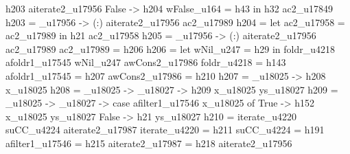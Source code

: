                                                                                                        h203 aiterate2_u17956
                                                                                                     False ->
                                                                                                       h204
                                                                                      wFalse_u164 = h43
                                                                                    in h32 ac2_u17849
                                                        h203 = _u17956 -> (:) aiterate2_u17956 ac2_u17989
                                                        h204 = let ac2_u17958 = ac2_u17989
                                                               in h21 ac2_u17958
                                                        h205 = _u17956 -> (:) aiterate2_u17956 ac2_u17989
                                                        ac2_u17989 = h206
                                                        h206 = let wNil_u247 = h29
                                                               in foldr_u4218 afoldr1_u17545 wNil_u247 awCons2_u17986
                                                        foldr_u4218 = h143
                                                        afoldr1_u17545 = h207
                                                        awCons2_u17986 = h210
                                                        h207 = \x_u18025 -> h208 x_u18025
                                                        h208 = \x_u18025 -> \ys_u18027 -> h209 x_u18025 ys_u18027
                                                        h209 = \x_u18025 -> \ys_u18027 -> case afilter1_u17546 x_u18025 of
                                                                                            True ->
                                                                                              h152 x_u18025 ys_u18027
                                                                                            False ->
                                                                                              h21 ys_u18027
                                                        h210 = iterate_u4220 suCC_u4224 aiterate2_u17987
                                                        iterate_u4220 = h211
                                                        suCC_u4224 = h191
                                                        afilter1_u17546 = h215
                                                        aiterate2_u17987 = h218 aiterate2_u17956
